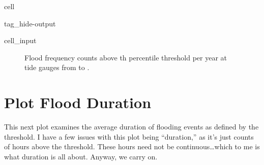\documentclass[letterpaper,10pt,english]{jupyterBook}
\begin{document}
\begin{sphinxuseclass}{cell}
\begin{sphinxuseclass}{tag_hide-output}
\begin{sphinxVerbatimInput}
\begin{sphinxuseclass}{cell_input}
\begin{sphinxVerbatim}[commandchars=\\\{\}]

  

   
\end{sphinxVerbatim}

\end{sphinxuseclass}\end{sphinxVerbatimInput}

\end{sphinxuseclass}
\end{sphinxuseclass}
\begin{figure}[htbp]
\centering
\capstart

\noindent{}
\caption{Flood frequency counts above th percentile threshold per year at  tide gauges from  to .}\label{\detokenize{notebooks/FloodFrequency:fig-threshold-counts}}\end{figure}


\section{Plot Flood Duration}
\label{\detokenize{notebooks/FloodFrequency:plot-flood-duration}}
\sphinxAtStartPar
This next plot examines the average duration of flooding events as defined by the threshold.
I have a few issues with this plot being “duration,” as it’s just counts of hours above the threshold. These hours need not be continuous…which to me is what duration is all about. Anyway, we carry on.
\end{document}

